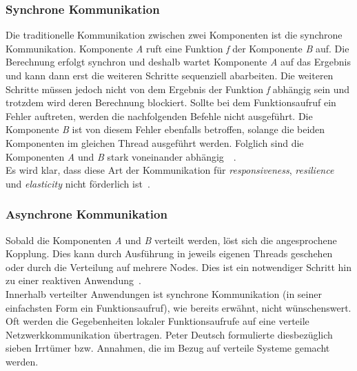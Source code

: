 \subsubsection{Synchrone Kommunikation}
Die traditionelle Kommunikation zwischen zwei Komponenten ist die synchrone Kommunikation. Komponente \textit{A} ruft eine Funktion \textit{f} der Komponente \textit{B} auf. Die Berechnung erfolgt synchron und deshalb wartet Komponente \textit{A} auf das Ergebnis und kann dann erst die weiteren Schritte sequenziell abarbeiten. Die weiteren Schritte müssen jedoch nicht von dem Ergebnis der Funktion \textit{f} abhängig sein und trotzdem wird deren Berechnung blockiert. Sollte bei dem Funktionsaufruf ein Fehler auftreten, werden die nachfolgenden Befehle nicht ausgeführt. Die Komponente \textit{B} ist von diesem Fehler ebenfalls betroffen, solange die beiden Komponenten im gleichen Thread ausgeführt werden. Folglich sind die Komponenten \textit{A} und \textit{B} stark voneinander abhängig~\cite[S.~22]{kuhn_reactive_2015}~\cite{jackson_how_2016}.\\
Es wird klar, dass diese Art der Kommunikation für \textit{responsiveness}, \textit{resilience} und \textit{elasticity} nicht förderlich ist~\cite[S.~46]{kuhn_reactive_2015}.

\subsubsection{Asynchrone Kommunikation}
Sobald die Komponenten \textit{A} und \textit{B} verteilt werden, löst sich die angesprochene Kopplung. Dies kann durch Ausführung in jeweils eigenen Threads geschehen oder durch die Verteilung auf mehrere Nodes. Dies ist ein notwendiger Schritt hin zu einer reaktiven Anwendung~\cite[S.~22]{kuhn_reactive_2015}.\\
Innerhalb verteilter Anwendungen ist synchrone Kommunikation (in seiner einfachsten Form ein Funktionsaufruf), wie bereits erwähnt, nicht wünschenswert. Oft werden die Gegebenheiten lokaler Funktionsaufrufe auf eine verteile Netzwerkkommunikation übertragen. Peter Deutsch formulierte diesbezüglich sieben Irrtümer bzw. Annahmen, die im Bezug auf verteile Systeme gemacht werden.\\

